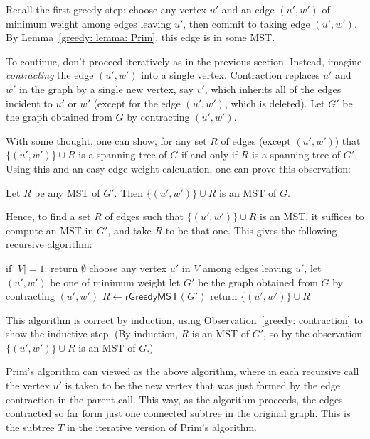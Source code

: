 Recall the first greedy step:
choose any vertex $u'$
and an edge $(u', w')$ of minimum weight among edges leaving $u'$,
then commit to taking edge $(u', w')$.
By Lemma~\ref{greedy: lemma: Prim}, this edge is in some MST.

To continue, don't proceed iteratively as in the previous section.
Instead, imagine \emph{contracting} the edge $(u', w')$ into a single vertex.
Contraction replaces $u'$ and $w'$ in the graph
by a single new vertex, say $v'$,
which inherits all of the edges incident to $u'$ or $w'$
(except for the edge $(u', w')$, which is deleted).
Let $G'$ be the graph obtained from $G$ by contracting $(u', w')$.

With some thought, one can show,
for any set $R$ of edges (except $(u',w')$) 
that $\{(u', w')\} \cup R$ is a spanning tree of $G$
if and only if $R$ is a spanning tree of $G'$.
Using this and an easy edge-weight calculation, one can prove this observation:
\begin{observation}\label{greedy: contraction}
  Let $R$ be any MST of $G'$.
  Then $\{(u', w')\} \cup R$ is an MST of $G$.
\end{observation}

Hence, to find a set $R$ of edges such that $\{(u', w')\} \cup R$ is an MST,
it suffices to compute an MST in $G'$, and take $R$ to be that one.
This gives the following recursive algorithm:
\begin{myframed}
  \begin{steps}
  \item[{{\sf rGreedyMST}$(G=(V,E))$:}]
    \step if $|V|=1$: return $\emptyset$
    \step choose any vertex $u'$ in $V$
    \step among edges leaving $u'$, let $(u', w')$ be one of minimum weight
    \step let $G'$ be the graph obtained from $G$ by contracting $(u', w')$
    \step $R \gets \textsf{rGreedyMST}(G')$
    \step return $\{(u', w')\} \cup R$
  \end{steps}
\end{myframed}

This algorithm is correct by induction,
using Observation~\ref{greedy: contraction} to show the inductive step.
(By induction, $R$ is an MST of $G'$,
so by the observation $\{(u', w')\} \cup R$ is an MST of $G$.)

Prim's algorithm can viewed as the above algorithm,
where in each recursive call the vertex $u'$ is taken
to be the new vertex that was just formed by the edge contraction in the parent call.
This way, as the algorithm proceeds, the edges contracted so
far form just one connected subtree in the original graph.
This is the subtree $T$ in the iterative version of Prim's algorithm.
  
